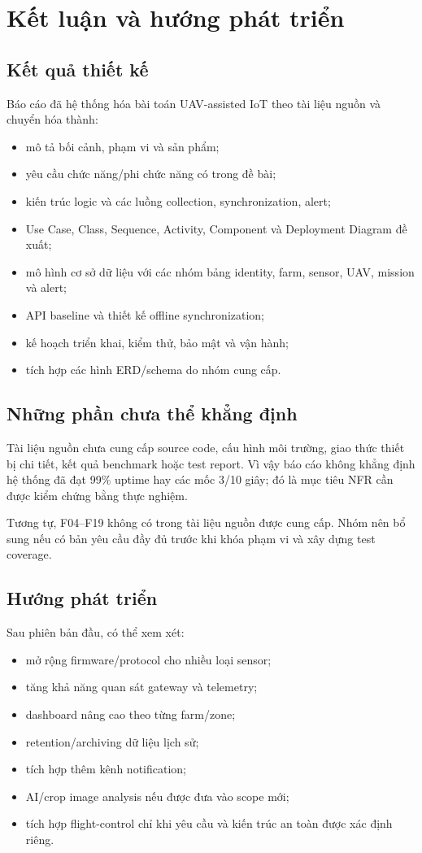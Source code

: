 
\chapter{Kết luận và hướng phát triển}

\section{Kết quả thiết kế}
Báo cáo đã hệ thống hóa bài toán UAV-assisted IoT theo tài liệu nguồn và chuyển hóa thành:
\begin{itemize}
  \item mô tả bối cảnh, phạm vi và sản phẩm;
  \item yêu cầu chức năng/phi chức năng có trong đề bài;
  \item kiến trúc logic và các luồng collection, synchronization, alert;
  \item Use Case, Class, Sequence, Activity, Component và Deployment Diagram đề xuất;
  \item mô hình cơ sở dữ liệu với các nhóm bảng identity, farm, sensor, UAV, mission và alert;
  \item API baseline và thiết kế offline synchronization;
  \item kế hoạch triển khai, kiểm thử, bảo mật và vận hành;
  \item tích hợp các hình ERD/schema do nhóm cung cấp.
\end{itemize}

\section{Những phần chưa thể khẳng định}
Tài liệu nguồn chưa cung cấp source code, cấu hình môi trường, giao thức thiết bị chi tiết, kết quả benchmark hoặc test report. Vì vậy báo cáo không khẳng định hệ thống đã đạt 99\% uptime hay các mốc 3/10 giây; đó là mục tiêu NFR cần được kiểm chứng bằng thực nghiệm.

Tương tự, F04--F19 không có trong tài liệu nguồn được cung cấp. Nhóm nên bổ sung nếu có bản yêu cầu đầy đủ trước khi khóa phạm vi và xây dựng test coverage.

\section{Hướng phát triển}
Sau phiên bản đầu, có thể xem xét:
\begin{itemize}
  \item mở rộng firmware/protocol cho nhiều loại sensor;
  \item tăng khả năng quan sát gateway và telemetry;
  \item dashboard nâng cao theo từng farm/zone;
  \item retention/archiving dữ liệu lịch sử;
  \item tích hợp thêm kênh notification;
  \item AI/crop image analysis nếu được đưa vào scope mới;
  \item tích hợp flight-control chỉ khi yêu cầu và kiến trúc an toàn được xác định riêng.
\end{itemize}


